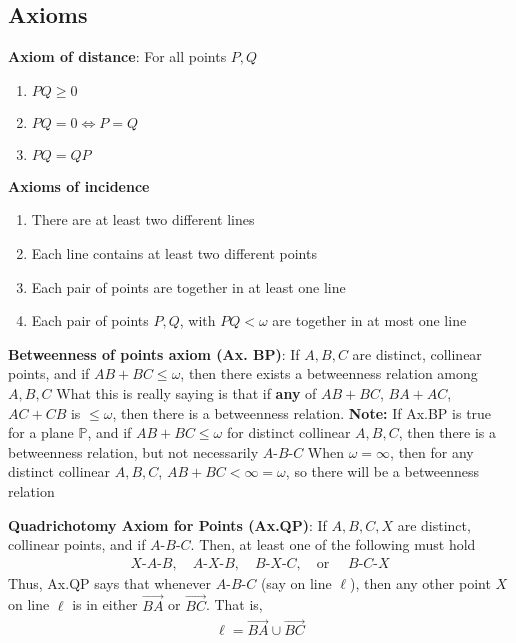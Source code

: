 \documentclass{report}
\begin{document}
    \subsection{Axioms}
    \item         \textbf{Axiom of distance}: For all points $P,Q$
        \begin{enumerate}
            \item $PQ \geq 0 $
            \item $PQ = 0 \iff P=Q $
            \item $PQ = QP $
        \end{enumerate}
    \item         \textbf{Axioms of incidence}
        \begin{enumerate}
            \item There are at least two different lines
            \item Each line contains at least two different points
            \item Each pair of points are together in at least one line
            \item Each pair of points $P,Q$, with $PQ < \omega$ are together in at most one line
        \end{enumerate}
    \item \textbf{Betweenness of points axiom (Ax. BP)}: If $A,B,C$ are distinct, collinear points, and if $AB + BC \leq \omega$, then there exists a betweenness relation among $A,B,C$
        \bigbreak \noindent 
        What this is really saying is that if \textbf{any} of $AB + BC$, $BA + AC$, $AC + CB$ is $ \leq \omega$, then there is a betweenness relation.
        \bigbreak \noindent 
        \textbf{Note:} If Ax.BP is true for a plane $\mathbb{P}$, and if $AB + BC \leq \omega$ for distinct collinear $A,B,C$, then there is a betweenness relation, but not necessarily $ A\text{-}B\text{-}C $
        \bigbreak \noindent 
        When $\omega = \infty$, then for any distinct collinear $A,B,C$, $AB +BC  < \infty = \omega $, so there will be a betweenness relation
    \item \textbf{Quadrichotomy Axiom for Points (Ax.QP)}: If $A,B,C,X$ are distinct, collinear points, and if $ A\text{-}B\text{-}C$. Then, at least one of the following must hold
        \begin{align*}
            X\text{-}A\text{-}B, \quad A\text{-}X\text{-}B, \quad B\text{-}X\text{-}C, \quad \text{or } \quad B\text{-}C\text{-}X
        \end{align*}
        \bigbreak \noindent 
        Thus, Ax.QP says that whenever $ A\text{-}B\text{-}C$ (say on line $\ell$), then any other point $X$ on line $\ell$ is in either $ \overrightarrow{BA} $ or $ \overrightarrow{BC} $. That is,
        \begin{align*}
            \ell = \overrightarrow{BA} \cup \overrightarrow{BC}
        \end{align*}
\end{document}

